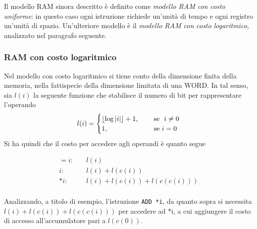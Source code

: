 \documentclass{subfiles}
\begin{document}
Il modello RAM sinora descritto è definito come \emph{modello RAM con costo uniforme}: in questo caso ogni istruzione richiede un'unità di tempo e ogni registro un'unità di spazio.
Un'ulteriore modello è il \emph{modello RAM con costo logaritmico}, analizzato nel paragrafo seguente.

\subsubsection{RAM con costo logaritmico}
Nel modello con costo logaritmico si tiene conto della dimensione finita della memoria, nella fattispecie della dimensione limitata di una WORD.
In tal senso, sia \(l(i)\) la seguente funzione che stabilisce il numero di bit per rappresentare l'operando
\[
    l(i) = \begin{cases}
        \floor{\log \abs{i}} + 1, \quad & \text{se } i \neq 0 \\
        1, \quad                        & \text{se} i = 0     \\
    \end{cases}
\]
Si ha quindi che il costo per accedere agli operandi è quanto segue

\[\begin{aligned}
        =i: & \quad  l(i)                       \\
        i:  & \quad l(i) + l(c(i))              \\
        *i: & \quad l(i) + l(c(i)) + l(c(c(i))) \\
    \end{aligned}\]

\noindent Analizzando, a titolo di esempio, l'istruzione \lstinline[language = RAM]{ADD *i}, da quanto sopra si necessita \(l(i) + l(c(i)) + l(c(c(i)))\) per accedere ad *i,
a cui aggiungere il costo di accesso all'accumulatore pari a \(l(c(0))\).
\end{document}

